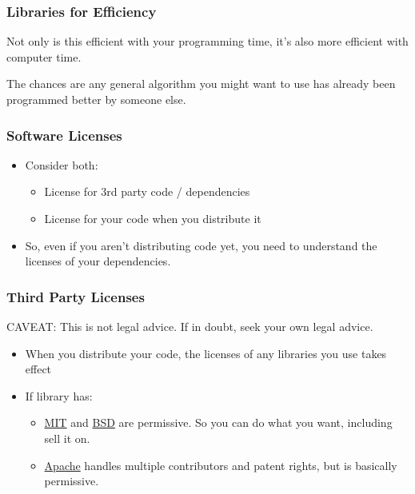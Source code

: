 \subsubsection{Libraries for Efficiency}\label{libraries-for-efficiency}

Not only is this efficient with your programming time, it's also more
efficient with computer time.

The chances are any general algorithm you might want to use has already
been programmed better by someone else.

\subsubsection{Software Licenses}\label{software-licenses}

\begin{itemize}
\itemsep1pt\parskip0pt
\item
  Consider both:

  \begin{itemize}
  \itemsep1pt\parskip0pt
  \item
    License for 3rd party code / dependencies
  \item
    License for your code when you distribute it
  \end{itemize}
\item
  So, even if you aren't distributing code yet, you need to understand
  the licenses of your dependencies.
\end{itemize}

\subsubsection{Third Party Licenses}\label{third-party-licenses}

CAVEAT: This is not legal advice. If in doubt, seek your own legal
advice.

\begin{itemize}
\itemsep1pt\parskip0pt
\item
  When you distribute your code, the licenses of any libraries you use
  takes effect
\item
  If library has:

  \begin{itemize}
  \itemsep1pt\parskip0pt
  \item
    \href{http://opensource.org/licenses/MIT}{MIT} and
    \href{http://opensource.org/licenses/BSD-3-Clause}{BSD} are
    permissive. So you can do what you want, including sell it on.
  \item
    \href{http://opensource.org/licenses/Apache-2.0}{Apache} handles
    multiple contributors and patent rights, but is basically
    permissive.
  \end{itemize}
\end{itemize}


